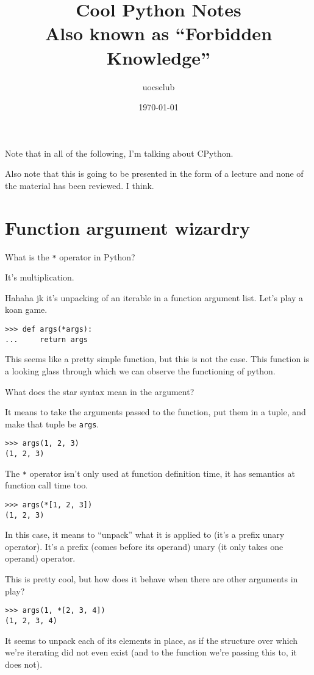 \documentclass[11pt]{article}
\author{uocsclub}
\date{\today}
\title{Cool Python Notes\\\medskip
\large Also known as ``Forbidden Knowledge''}
\begin{document}
\maketitle
\tableofcontents

Note that in all of the following, I'm talking about CPython.

Also note that this is going to be presented in the form of a lecture
and none of the material has been reviewed. I think.

\section{Function argument wizardry}
\label{sec:orgf96bee8}
What is the \texttt{*} operator in Python?

It's multiplication.

Hahaha jk it's unpacking of an iterable in a function argument
list. Let's play a koan game.

\begin{verbatim}
>>> def args(*args):
...     return args
\end{verbatim}
This seems like a pretty simple function, but this is not the
case. This function is a looking glass through which we can observe
the functioning of python.

What does the star syntax mean in the argument?

It means to take the arguments passed to the function, put them in a
tuple, and make that tuple be \texttt{args}.
\begin{verbatim}
>>> args(1, 2, 3)
(1, 2, 3)
\end{verbatim}

The \texttt{*} operator isn't only used at function definition time, it has
semantics at function call time too.
\begin{verbatim}
>>> args(*[1, 2, 3])
(1, 2, 3)
\end{verbatim}
In this case, it means to ``unpack'' what it is applied to (it's a
prefix unary operator). It's a prefix (comes before its operand)
unary (it only takes
one operand) operator.

This is pretty cool, but how does it behave when there are other
arguments in play?
\begin{verbatim}
>>> args(1, *[2, 3, 4])
(1, 2, 3, 4)
\end{verbatim}
It seems to unpack each of its elements in place, as if the
structure over which we're iterating did not even exist (and to the
function we're passing this to, it does not).
\end{document}
